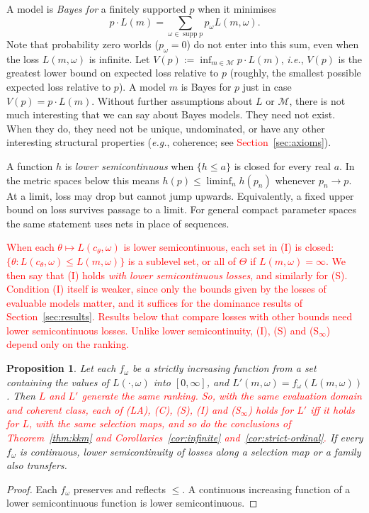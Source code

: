 \documentclass[11pt]{article}
\newtheorem{proposition}[theorem]{Proposition}
\theoremstyle{definition}
\theoremstyle{remark}
\newcommand{\M}{\mathcal M}
\newcommand{\supp}{\operatorname{supp}}
\begin{document}
A model is \emph{Bayes for} a finitely supported $p$ when it minimises
\[
 p\cdot L(m)=\sum_{\omega\in\supp p}p_\omega L(m,\omega).
\]
Note that probability zero worlds ($p_\omega=0$) do not enter into this sum, even when the loss $L(m,\omega)$ is infinite. Let $V(p):=\inf_{m\in\M}p\cdot L(m)$, \textit{i.e.}, $V(p)$ is the greatest lower bound on expected loss relative to $p$ (roughly, the smallest possible expected loss relative to $p$). A model $m$ is Bayes for $p$ just in case $V(p)=p\cdot L(m)$. Without further assumptions about $L$ or $\M$, there is not much interesting that we can say about Bayes models. They need not exist. When they do, they need not be unique, undominated, or have any other interesting structural properties (\textit{e.g.}, coherence; see \textcolor{red}{Section~\ref{sec:axioms}}).

A function $h$ is \emph{lower semicontinuous} when $\{h\le a\}$ is closed for every real $a$. In the metric spaces below this means $h(p)\le\liminf_n h(p_n)$ whenever $p_n\to p$. At a limit, loss may drop but cannot jump upwards. Equivalently, a fixed upper bound on loss survives passage to a limit. For general compact parameter spaces the same statement uses nets in place of sequences.

\textcolor{red}{When each $\theta\mapsto L(c_\theta,\omega)$ is lower semicontinuous, each set in (I) is closed: $\{\theta:L(c_\theta,\omega)\le L(m,\omega)\}$ is a sublevel set, or all of $\Theta$ if $L(m,\omega)=\infty$. We then say that (I) holds \emph{with lower semicontinuous losses}, and similarly for (S). Condition (I) itself is weaker, since only the bounds given by the losses of evaluable models matter, and it suffices for the dominance results of Section~\ref{sec:results}. Results below that compare losses with other bounds need lower semicontinuous losses. Unlike lower semicontinuity, (I), (S) and (S$_\infty$) depend only on the ranking.}
\begin{proposition}\label{prop:ordinal}
Let each $f_\omega$ be a strictly increasing function from a set containing the values of $L(\cdot,\omega)$ into $[0,\infty]$, and $L'(m,\omega)=f_\omega(L(m,\omega))$. Then \textcolor{red}{$L$ and $L'$ generate the same ranking. So, with the same evaluation domain and coherent class, each of (LA), (C), (S), (I) and (S$_\infty$) holds for $L'$ iff it holds for $L$, with the same selection maps, and so do the conclusions of Theorem~\ref{thm:kkm} and Corollaries~\ref{cor:infinite} and~\ref{cor:strict-ordinal}.} If every $f_\omega$ is continuous, lower semicontinuity of losses along a selection map or a family also transfers.
\end{proposition}
\begin{proof}
Each $f_\omega$ preserves and reflects $\le$. A continuous increasing function of a lower semicontinuous function is lower semicontinuous.
\end{proof}
\end{document}
